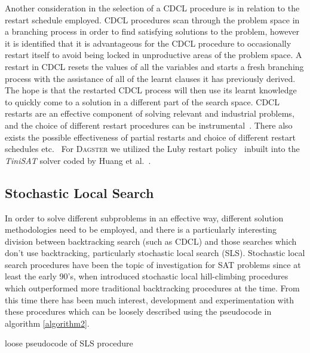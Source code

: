 \documentclass[
10pt, %
a4paper, %
oneside, %
headinclude,footinclude, %
BCOR5mm, %
]{scrartcl}
\begin{document}
Another consideration in the selection of a CDCL procedure is in relation to the restart schedule employed.
CDCL procedures scan through the problem space in a branching process in order to find satisfying solutions to the problem, however it is identified that it is advantageous for the CDCL procedure to occasionally restart itself to avoid being locked in unproductive areas of the problem space.
A restart in CDCL resets the values of all the variables and starts a fresh branching process with the assistance of all of the learnt clauses it has previously derived.
The hope is that the restarted CDCL process will then use its learnt knowledge to quickly come to a solution in a different part of the search space.
CDCL restarts are an effective component of solving relevant and industrial problems, and the choice of different restart procedures can be instrumental~\cite{DBLP:conf/ijcai/Huang07}.
There also exists the possible effectiveness of partial restarts and choice of different restart schedules etc.~\cite{conf/sat/RamosTH11}
For \textsc{Dagster} we utilized the Luby restart policy~\cite{Luby93optimalspeedup} inbuilt into the \textit{TiniSAT} solver coded by Huang et al.~\cite{DBLP:conf/ijcai/Huang07}.





\subsection{Stochastic Local Search}\label{sec:SLS_intro}

In order to solve different subproblems in an effective way, different solution methodologies need to be employed, and there is a particularly interesting division between backtracking search (such as CDCL) and those searches which don't use backtracking, particularly stochastic local search (SLS).
Stochastic local search procedures have been the topic of investigation for SAT problems since at least the early 90's, when \cite{10.5555/1867135.1867203,10.1145/130836.130837} introduced stochastic local hill-climbing procedures which outperformed more traditional backtracking procedures at the time.
From this time there has been much interest, development and experimentation with these procedures which can be loosely described using the pseudocode in algorithm \ref{algorithm2}.

\begin{algorithm}[H]
\SetAlgoLined
{}
 \caption{loose pseudocode of SLS procedure}\label{algorithm2}
\end{algorithm}
\end{document}
